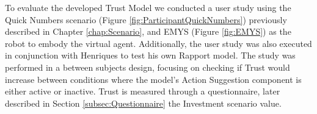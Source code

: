 \label{chap:UserStudies}
To evaluate the developed Trust Model we conducted a user study using the Quick Numbers scenario  (Figure \ref{fig:ParticipantQuickNumbers}) previously described in Chapter \ref{chap:Scenario}, and \ac{EMYS} (Figure \ref{fig:EMYS}) as the robot to embody the virtual agent. Additionally, the user study was also executed in conjunction with Henriques to test his own Rapport model. The study was performed in a between subjects design, focusing on checking if Trust would increase between conditions where the model's Action Suggestion component is either active or inactive. Trust is measured through a questionnaire, later described in Section \ref{subsec:Questionnaire} the Investment scenario value.



